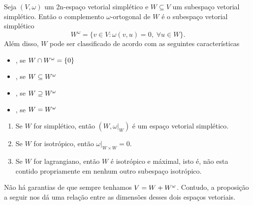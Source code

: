 \documentclass{beamer}
\begin{document}
	\begin{frame}
		\begin{definicao}
			Seja $(V, \omega)$ um 2n-espaço vetorial simplético e $W\subseteq V$ um subespaço vetorial simplético. Então o complemento $\omega$-ortogonal de $W$ é o subespaço vetorial simplético
			$$
			W^{\omega} = \{v\in V: \omega(v,u) = 0,\;\forall u\in W \}.
			$$
			Além disso, $W$ pode ser classificado de acordo com as seguintes características
			\begin{itemize}
				\item {}, se $W\cap W^{\omega} = \{0\}$
				
				\item {}, se $W \subseteq W^{\omega}$
				
				\item {}, se $W\supseteq W^{\omega}$
				
				\item {}, se $W =W^{\omega}$
			\end{itemize}
		\end{definicao}	
		
	\end{frame}
	
	\begin{frame}
		
		\begin{lema}
			\begin{enumerate}
				\item Se $W$ for simplético, então $(W, \omega|_{W})$ é um espaço vetorial simplético.
				
				\item Se $W$ for isotrópico, então $\omega|_{W\times W} = 0$.
				
				\item Se $W$ for lagrangiano, então $W$ é isotrópico e máximal, isto é, não esta contido propriamente em nenhum outro subespaço isotrópico.
			\end{enumerate}
		\end{lema}
		Não há garantias de que sempre tenhamos $V = W + W^{\omega}$. Contudo, a proposição a seguir nos dá uma relação entre as dimensões desses dois espaços vetoriais.
		
	\end{frame}
	
\end{document}
